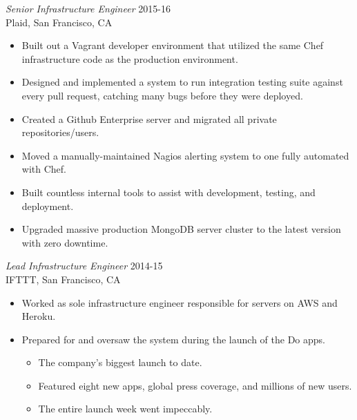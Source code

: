 \documentclass[line,margin]{res}
\begin{document}
\begin{resume}
  {\sl Senior Infrastructure Engineer}  \hfill 2015-16 \\
  Plaid,
  San Francisco, CA
  \begin{itemize}  \itemsep -2pt %
    \item Built out a Vagrant developer environment that utilized the same Chef infrastructure code as the production environment.
    \item Designed and implemented a system to run integration testing suite against every pull request, catching many bugs before they were deployed.
    \item Created a Github Enterprise server and migrated all private repositories/users.
    \item Moved a manually-maintained Nagios alerting system to one fully automated with Chef.
    \item Built countless internal tools to assist with development, testing, and deployment.
    \item Upgraded massive production MongoDB server cluster to the latest version with zero downtime.
  \end{itemize}

  {\sl Lead Infrastructure Engineer}  \hfill 2014-15 \\
  IFTTT,
  San Francisco, CA
  \begin{itemize}  \itemsep -2pt %
    \item Worked as sole infrastructure engineer responsible for servers on AWS and Heroku.
    \item Prepared for and oversaw the system during the launch of the Do apps.
 
    \vspace{-2.5mm} %
    \begin{itemize}  \itemsep -3pt %
      \item The company's biggest launch to date.
      \item Featured eight new apps, global press coverage, and millions of new users. 
      \item The entire launch week went impeccably.
    \end{itemize}
    \vspace{-2.0mm} %


\end{itemize}
\end{resume}
\end{document}

